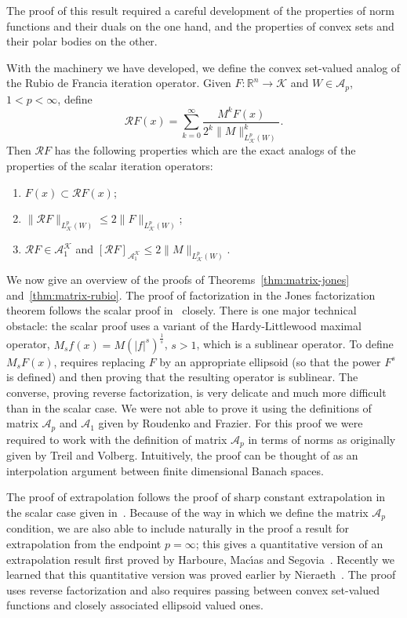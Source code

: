 \documentclass[12pt]{amsart}
\theoremstyle{definition}
\theoremstyle{remark}
\numberwithin{equation}{section}
\newcommand{\rn}{{{\mathbb R}^n}}
\newcommand{\Rdf}{\mathcal{R}}
\newcommand{\A}{\mathcal A}
\newcommand{\K}{\mathcal K}
\begin{document}
The proof of this result required a careful development of the
properties of norm functions and their duals on the one hand, and the
properties of convex sets and their polar bodies on the other.

With the machinery we have developed, we define the convex set-valued
analog of the Rubio de Francia iteration operator.   Given $F : \rn
\rightarrow \K$  and $W\in \A_p$, $1<p<\infty$, define
%
\[ \Rdf F(x) = \sum_{k=0}^\infty \frac{M^kF(x)}{2^k
    \|M\|^k_{L^p_\K(W)}}. \]
%
Then $\Rdf F$ has the following properties which are the exact analogs
of the properties of the scalar iteration operators:
%
\begin{enumerate}
\item $F(x) \subset \Rdf F(x)$;

\item $\|\Rdf F\|_{L^p_\K(W)} \leq 2 \|F\|_{L^p_\K(W)}$;

  \item $\Rdf F \in \A_1^\K$ and $[\Rdf F]_{\A_1^\K} \leq 2
    \|M\|_{L^p_\K(W)}$.
  \end{enumerate}

  \medskip

We now give an overview of the proofs of
Theorems~\ref{thm:matrix-jones} and~\ref{thm:matrix-rubio}.  The proof
of factorization in the Jones factorization theorem follows the scalar
proof in~\cite{dcu-paseky} closely.  There is one major technical
obstacle:  the scalar proof uses a variant of the Hardy-Littlewood
maximal operator, $M_sf(x) = M(|f|^s)^{\frac1s}$, $s>1$, which is a
sublinear operator.   To define $M_sF(x)$, requires replacing $F$ by an
appropriate ellipsoid (so that the power $F^s$ is defined) and then
proving that the resulting operator is sublinear.    The converse,
proving reverse factorization, is very delicate and much more
difficult than in the scalar case.  We were not able to
prove it using the definitions of matrix $\A_p$
and $\A_1$ given by Roudenko and Frazier.  For
this proof we were required to work with the definition of matrix
$\A_p$ in terms of norms as originally given by Treil and Volberg.
Intuitively, the proof can be thought of as an interpolation argument
between finite dimensional Banach spaces.

The proof of extrapolation follows the proof of sharp constant
extrapolation in the scalar case given in~\cite{cruz-martell-perezBook}.  Because of the
way in which we define the matrix $\A_p$ condition, we are also able
to include naturally in the proof  a result for extrapolation from the endpoint
$p=\infty$; this gives a quantitative version of an extrapolation result
first proved by Harboure, Mac\'\i as and Segovia~\cite{MR944321}.
Recently we learned that this quantitative version was proved earlier
by Nieraeth~\cite{nieraeth-thesis,MR4000248}.  The proof uses reverse
factorization and also requires passing between convex set-valued
functions and closely associated ellipsoid valued ones.  
\end{document}
